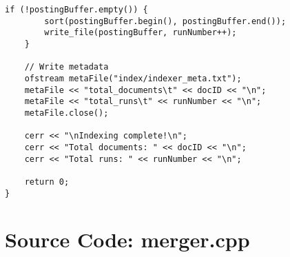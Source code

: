 \documentclass{article}
\begin{document}
\begin{lstlisting}[caption={The complete source code for the indexer component.}, label={lst:indexer}]
    if (!postingBuffer.empty()) {
        sort(postingBuffer.begin(), postingBuffer.end());
        write_file(postingBuffer, runNumber++);
    }

    // Write metadata
    ofstream metaFile("index/indexer_meta.txt");
    metaFile << "total_documents\t" << docID << "\n";
    metaFile << "total_runs\t" << runNumber << "\n";
    metaFile.close();

    cerr << "\nIndexing complete!\n";
    cerr << "Total documents: " << docID << "\n";
    cerr << "Total runs: " << runNumber << "\n";

    return 0;
}
\end{lstlisting}

\section{Source Code: merger.cpp}
\end{document}

